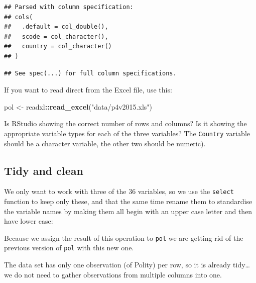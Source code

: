 \documentclass[]{book}
\newenvironment{Shaded}{\begin{snugshade}}{\end{snugshade}}
\newcommand{\DataTypeTok}[1]{\textcolor[rgb]{0.13,0.29,0.53}{#1}}
\newcommand{\KeywordTok}[1]{\textcolor[rgb]{0.13,0.29,0.53}{\textbf{#1}}}
\newcommand{\NormalTok}[1]{#1}
\newcommand{\OperatorTok}[1]{\textcolor[rgb]{0.81,0.36,0.00}{\textbf{#1}}}
\newcommand{\StringTok}[1]{\textcolor[rgb]{0.31,0.60,0.02}{#1}}
\begin{document}
\begin{verbatim}
## Parsed with column specification:
## cols(
##   .default = col_double(),
##   scode = col_character(),
##   country = col_character()
## )
\end{verbatim}

\begin{verbatim}
## See spec(...) for full column specifications.
\end{verbatim}

If you want to read direct from the Excel file, use this:

\begin{Shaded}
\begin{Highlighting}[]
\NormalTok{pol <-}\StringTok{ }\NormalTok{readxl}\OperatorTok{::}\KeywordTok{read_excel}\NormalTok{(}\StringTok{"data/p4v2015.xls"}\NormalTok{)}
\end{Highlighting}
\end{Shaded}

Is RStudio showing the correct number of rows and columns? Is it showing the appropriate variable types for each of the three variables? The \texttt{Country} variable should be a character variable, the other two should be numeric).

\hypertarget{tidy-and-clean}{%
\subsection{Tidy and clean}\label{tidy-and-clean}}

We only want to work with three of the 36 variables, so we use the \texttt{select} function to keep only these, and that the same time rename them to standardise the variable names by making them all begin with an upper case letter and then have lower case:

\begin{Shaded}
\end{Shaded}

Because we assign the result of this operation to \texttt{pol} we are getting rid of the previous version of \texttt{pol} with this new one.

The data set has only one observation (of Polity) per row, so it is already tidy\ldots{} we do not need to gather observations from multiple columns into one.
\end{document}
